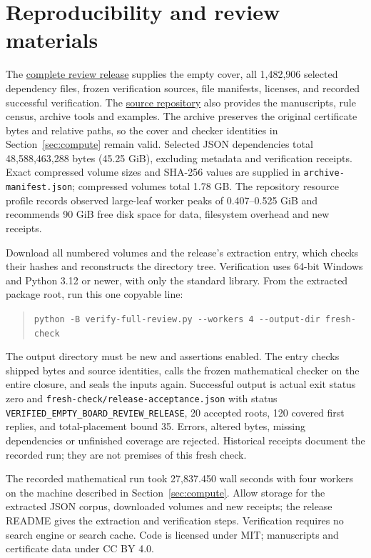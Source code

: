 \documentclass[11pt]{article}
\theoremstyle{definition}
\theoremstyle{remark}
\newcommand{\code}[1]{\texttt{#1}}
\begin{document}
\section{Reproducibility and review materials}
\label{sec:repro}
The \href{https://github.com/lgqdaxia/infinite-freestyle-gomoku-proof/releases/tag/review-v1-20261004}{complete review release} supplies the empty cover,
all 1,482,906 selected dependency files, frozen verification sources,
file manifests, licenses, and recorded successful verification. The
\href{https://github.com/lgqdaxia/infinite-freestyle-gomoku-proof}{source repository}
also provides the manuscripts, rule census, archive tools and examples.
The archive preserves the original certificate bytes and relative paths,
so the cover and checker identities in Section~\ref{sec:compute} remain valid.
Selected JSON dependencies total 48,588,463,288 bytes (45.25 GiB), excluding
metadata and verification receipts. Exact compressed volume sizes and
SHA-256 values are supplied in \code{archive-manifest.json}; compressed
volumes total 1.78 GB. The repository resource profile records observed
large-leaf worker peaks of 0.407--0.525 GiB and recommends 90 GiB free
disk space for data, filesystem overhead and new receipts.

Download all numbered volumes and the release's extraction entry, which
checks their hashes and reconstructs the directory tree. Verification uses
64-bit Windows and Python 3.12 or newer, with only the standard library.
From the extracted package root, run this one copyable line:
\begin{quote}\small
\verb|python -B verify-full-review.py --workers 4 --output-dir fresh-check|
\end{quote}
The output directory must be new and assertions enabled. The entry checks
shipped bytes and source identities, calls the frozen mathematical checker
on the entire closure, and seals the inputs again. Successful output is
actual exit status zero and \code{fresh-check/release-acceptance.json} with
status \code{VERIFIED\_EMPTY\_BOARD\_REVIEW\_RELEASE}, 20 accepted roots,
120 covered first replies, and total-placement bound 35. Errors, altered
bytes, missing dependencies or unfinished coverage are rejected. Historical
receipts document the recorded run; they are not premises of this fresh check.

The recorded mathematical run took 27,837.450 wall seconds with four workers
on the machine described in Section~\ref{sec:compute}.
Allow storage for the extracted JSON corpus, downloaded volumes and new
receipts; the release README gives the extraction and verification steps.
Verification requires no search engine or search cache. Code is licensed
under MIT; manuscripts and certificate data under CC BY 4.0.
\end{document}
